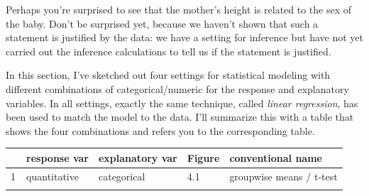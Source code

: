 \documentclass[]{tufte-book}
\begin{document}
Perhaps you're surprised to see that the mother's height is related to the sex of the baby. Don't be surprised yet, because we haven't shown that such a statement is justified by the data: we have a setting for inference but have not yet carried out the inference calculations to tell us if the statement is justified.

In this section, I've sketched out four settings for statistical modeling with different combinations of categorical/numeric for the response and explanatory variables. In all settings, exactly the same technique, called \emph{linear regression}, has been used to match the model to the data. I'll summarize this with a table that shows the four combinations and refers you to the corresponding table.

\begin{longtable}[]{@{}lllll@{}}
\toprule
\begin{minipage}[b]{0.03\columnwidth}\raggedright
~\strut
\end{minipage} & \begin{minipage}[b]{0.24\columnwidth}\raggedright
response var\strut
\end{minipage} & \begin{minipage}[b]{0.29\columnwidth}\raggedright
explanatory var\strut
\end{minipage} & \begin{minipage}[b]{0.15\columnwidth}\raggedright
Figure\strut
\end{minipage} & \begin{minipage}[b]{0.14\columnwidth}\raggedright
conventional name\strut
\end{minipage}\tabularnewline
\midrule
\endhead
\begin{minipage}[t]{0.03\columnwidth}\raggedright
1\strut
\end{minipage} & \begin{minipage}[t]{0.24\columnwidth}\raggedright
quantitative\strut
\end{minipage} & \begin{minipage}[t]{0.29\columnwidth}\raggedright
categorical\strut
\end{minipage} & \begin{minipage}[t]{0.15\columnwidth}\raggedright
4.1\strut
\end{minipage} & \begin{minipage}[t]{0.14\columnwidth}\raggedright
groupwise means / t-test\strut
\end{minipage}\tabularnewline
\begin{minipage}[t]{0.03\columnwidth}\raggedright

\end{minipage}
\end{longtable}
\end{document}
